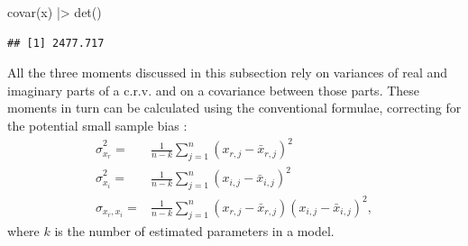 \documentclass[
]{book}
\newenvironment{Shaded}{\begin{snugshade}}{\end{snugshade}}
\newcommand{\FunctionTok}[1]{\textcolor[rgb]{0.00,0.00,0.00}{#1}}
\newcommand{\NormalTok}[1]{#1}
\newcommand{\SpecialCharTok}[1]{\textcolor[rgb]{0.00,0.00,0.00}{#1}}
\begin{document}
\begin{Shaded}
\begin{Highlighting}[]
\FunctionTok{covar}\NormalTok{(x) }\SpecialCharTok{|\textgreater{}} \FunctionTok{det}\NormalTok{()}
\end{Highlighting}
\end{Shaded}

\begin{verbatim}
## [1] 2477.717
\end{verbatim}

All the three moments discussed in this subsection rely on variances of real and imaginary parts of a c.r.v. and on a covariance between those parts. These moments in turn can be calculated using the conventional formulae, correcting for the potential small sample bias \citep{referenceSBA}:
\begin{equation}
    \begin{aligned}
        \hat{\sigma}_{x_r}^2 = & \frac{1}{n-k} \sum_{j=1}^n (x_{r,j}-\bar{x}_{r,j})^2 \\
        \hat{\sigma}_{x_i}^2 = & \frac{1}{n-k} \sum_{j=1}^n (x_{i,j}-\bar{x}_{i,j})^2 \\
        \hat{\sigma}_{x_r, x_i} = & \frac{1}{n-k} \sum_{j=1}^n (x_{r,j}-\bar{x}_{r,j})(x_{i,j}-\bar{x}_{i,j})^2 ,
    \end{aligned}
    \label{eq:crvMomentSecondSample}
\end{equation}
where \(k\) is the number of estimated parameters in a model.
\end{document}
